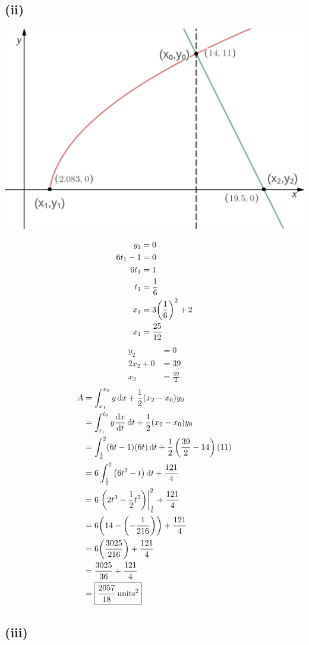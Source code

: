 \documentclass[a4paper,12pt]{article}
\begin{document}
\subsection*{(ii)}
\begin{center}
\includegraphics[width=.69\textwidth]{q3.png}
\end{center}
\[\begin{aligned}
    y_1&=0\\
    6t_1-1&=0\\
    6t_1&=1\\
    t_1&=\frac16\\
    x_1&=3\pqty{\frac16}^2+2\\
    x_1&=\frac{25}{12}
\end{aligned}\]
\[\begin{aligned}
    y_2&=0\\
    2x_2+0&=39\\
    x_2&=\frac{39}2
\end{aligned}\]
\[\begin{aligned}
    A&=\int_{x_1}^{x_0}y\dd{x}+\frac12(x_2-x_0)y_0\\
     &=\int_{t_1}^{t_0}y\dv{x}{t}\dd{t}+\frac12(x_2-x_0)y_0\\
     &=\int_{\frac16}^2(6t-1)(6t)\dd{t}+\frac12\left(\frac{39}2-14\right)(11)\\
     &=6\int_{\frac16}^2\pqty{6t^2-t}\dd{t}+\frac{121}4\\
     &=6\eval{\pqty{2t^3-\frac12t^2}}_{\frac16}^2+\frac{121}4\\
     &=6\pqty{14-\pqty{-\frac1{216}}}+\frac{121}4\\
     &=6\pqty{\frac{3025}{216}}+\frac{121}4\\
     &=\frac{3025}{36}+\frac{121}4\\
     &=\boxed{\frac{2057}{18}\,\text{units}^2}
\end{aligned}\]
\subsection*{(iii)}
\end{document}
